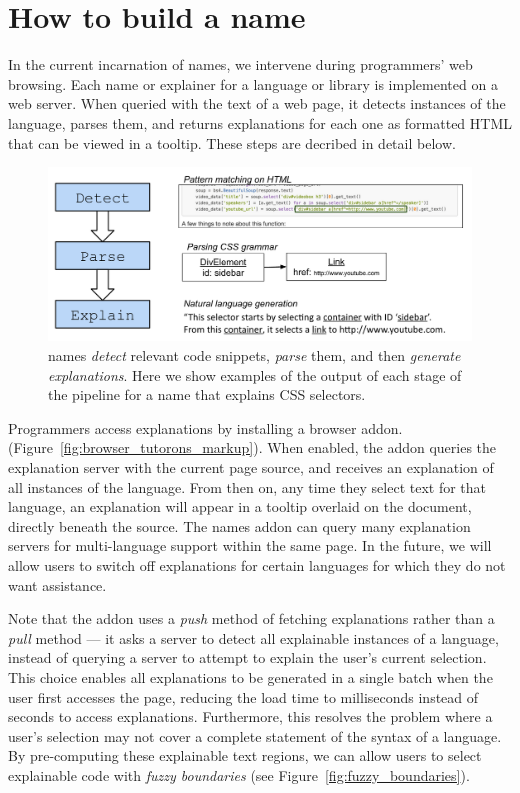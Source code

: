 \section{How to build a \gls{name}}


In the current incarnation of \glspl{name}, we intervene during programmers' web browsing.
Each \gls{name} or explainer for a language or library is implemented on a web server.
When queried with the text of a web page, it detects instances of the language, parses them, and returns explanations for each one as formatted HTML that can be viewed in a tooltip.
These steps are decribed in detail below.

\begin{figure}
\centering
    \includegraphics[width=.4\textwidth]{figures/explanation_pipeline}
    \caption{\Glspl{name} \emph{detect} relevant code snippets, \emph{parse} them, and then \emph{generate explanations}.  Here we show examples of the output of each stage of the pipeline for a \gls{name} that explains CSS selectors.}
    \label{fig:explanation_pipeline}
\end{figure}

Programmers access explanations by installing a browser addon.  (Figure~\ref{fig:browser_tutorons_markup}).
When enabled, the addon queries the explanation server with the current page source, and receives an explanation of all instances of the language.
From then on, any time they select text for that language, an explanation will appear in a tooltip overlaid on the document, directly beneath the source.
The \Glspl{name} addon can query many explanation servers for multi-language support within the same page.
In the future, we will allow users to switch off explanations for certain languages for which they do not want assistance.

Note that the addon uses a \emph{push} method of fetching explanations rather than a \emph{pull} method --- it asks a server to detect all explainable instances of a language, instead of querying a server to attempt to explain the user's current selection.
This choice enables all explanations to be generated in a single batch when the user first accesses the page, reducing the load time to milliseconds instead of seconds to access explanations.
Furthermore, this resolves the problem where a user's selection may not cover a complete statement of the syntax of a language.
By pre-computing these explainable text regions, we can allow users to select explainable code with \emph{fuzzy boundaries} (see Figure~\ref{fig:fuzzy_boundaries}).


